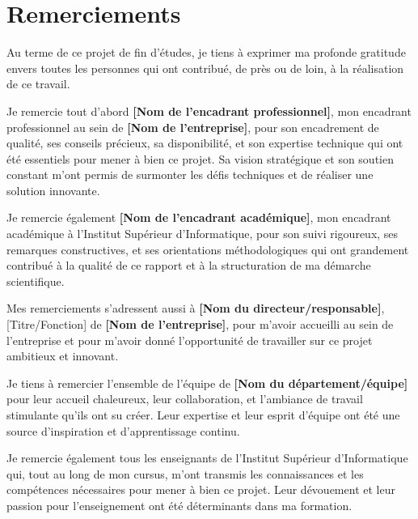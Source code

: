 \chapter*{Remerciements}

\vspace{1cm}

Au terme de ce projet de fin d'études, je tiens à exprimer ma profonde gratitude envers toutes les personnes qui ont contribué, de près ou de loin, à la réalisation de ce travail.

\vspace{0.5cm}

Je remercie tout d'abord \textbf{[Nom de l'encadrant professionnel]}, mon encadrant professionnel au sein de \textbf{[Nom de l'entreprise]}, pour son encadrement de qualité, ses conseils précieux, sa disponibilité, et son expertise technique qui ont été essentiels pour mener à bien ce projet. Sa vision stratégique et son soutien constant m'ont permis de surmonter les défis techniques et de réaliser une solution innovante.

\vspace{0.5cm}

Je remercie également \textbf{[Nom de l'encadrant académique]}, mon encadrant académique à l'Institut Supérieur d'Informatique, pour son suivi rigoureux, ses remarques constructives, et ses orientations méthodologiques qui ont grandement contribué à la qualité de ce rapport et à la structuration de ma démarche scientifique.

\vspace{0.5cm}

Mes remerciements s'adressent aussi à \textbf{[Nom du directeur/responsable]}, [Titre/Fonction] de \textbf{[Nom de l'entreprise]}, pour m'avoir accueilli au sein de l'entreprise et pour m'avoir donné l'opportunité de travailler sur ce projet ambitieux et innovant.

\vspace{0.5cm}

Je tiens à remercier l'ensemble de l'équipe de \textbf{[Nom du département/équipe]} pour leur accueil chaleureux, leur collaboration, et l'ambiance de travail stimulante qu'ils ont su créer. Leur expertise et leur esprit d'équipe ont été une source d'inspiration et d'apprentissage continu.

\vspace{0.5cm}

Je remercie également tous les enseignants de l'Institut Supérieur d'Informatique qui, tout au long de mon cursus, m'ont transmis les connaissances et les compétences nécessaires pour mener à bien ce projet. Leur dévouement et leur passion pour l'enseignement ont été déterminants dans ma formation.


